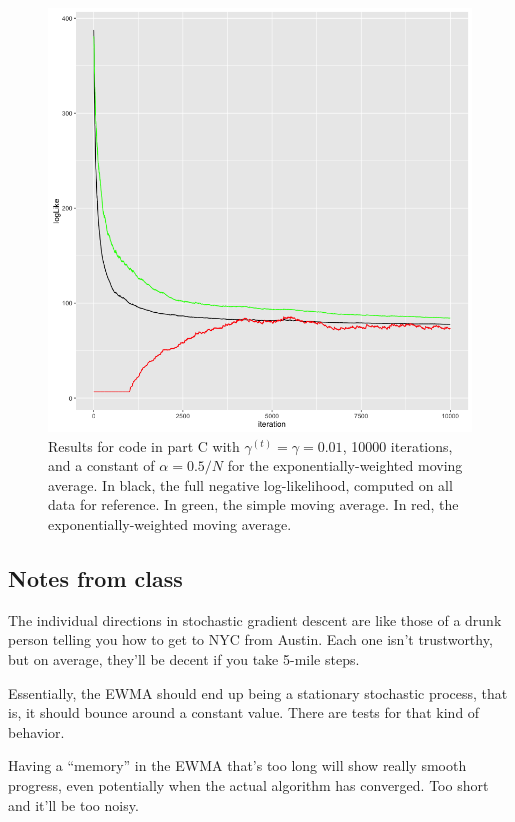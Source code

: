 \documentclass{article}
\begin{document}
\begin{figure}[h]
\begin{center}
\includegraphics[scale=0.5]{partC.png}
\caption{\label{fig:c}Results for code in part C with $\gamma^{(t)}=\gamma=0.01$, 10000 iterations, and a constant of 
$\alpha=0.5 / N$ for the exponentially-weighted moving average. In black, the full negative log-likelihood, computed
on all data for reference. In green, the simple moving average. In red, the exponentially-weighted moving average.}
\end{center}
\end{figure}





\subsection{Notes from class}
The individual directions in stochastic gradient descent are like those of a drunk person telling you how to get to
NYC from Austin. Each one isn't trustworthy, but on average, they'll be decent if you take 5-mile steps. 

Essentially, the EWMA should end up being a stationary stochastic process, that is, it should bounce around a constant value. There are tests for that kind of behavior.

Having a ``memory'' in the EWMA that's too long will show really smooth progress, even potentially when the actual algorithm has converged. Too short and it'll be too noisy.
\end{document}
